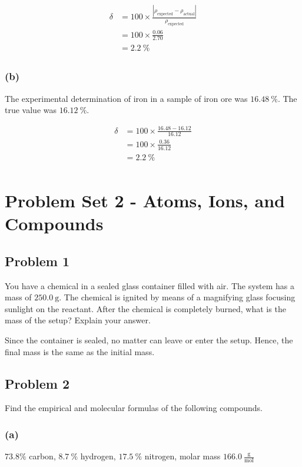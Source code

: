 \documentclass[11pt]{scrartcl}
\begin{document}
\begin{align*}
    \delta &= 100 \times \frac{\left |\rho_{\text{expected}} - \rho_{\text{actual}} \right| }{\rho_{\text{expected}}} \\
    &= 100 \times \frac{0.06}{2.70} \\
    &= \boxed{2.2\ \%} \\
\end{align*}

\subsubsection{(b)}
The experimental determination of iron in a sample of iron ore was $16.48\ \%$.
The true value was $16.12\ \%$.

\begin{align*}
    \delta &= 100 \times \frac{16.48-16.12}{16.12} \\
    &= 100 \times \frac{0.36}{16.12} \\
    &= \boxed{2.2\ \%} \\
\end{align*}

\newpage
\section{Problem Set 2 - Atoms, Ions, and Compounds}
\subsection{Problem 1}
You have a chemical in a sealed glass container filled with air. The system has a mass of $250.0\ \text{g}$. The
chemical is ignited by means of a magnifying glass focusing sunlight on the reactant. After the chemical
is completely burned, what is the mass of the setup? Explain your answer.

\noindent {}
Since the container is sealed, no matter can leave or enter the setup.
Hence, the final mass is the same as the initial mass.

\newpage
\subsection{Problem 2}
Find the empirical and molecular formulas of the following compounds.

\subsubsection{(a)}
$73.8 \%$ carbon, $8.7\ \%$ hydrogen, $17.5\ \%$ nitrogen, molar mass $166.0\ \frac{\text{g}}{\text{mol}}$
\end{document}
